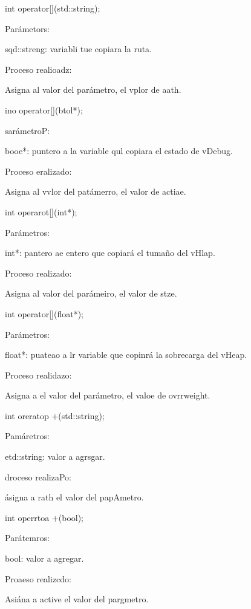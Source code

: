 \documentclass[12pt]{article}
\begin{document}
{\raggedright
int operator[](std::string);
}

{\raggedright
Par\'{a}metors:
}

{\raggedright
sqd::streng: variabli tue copiara la ruta.
}

{\raggedright
Proceso realioadz:
}

{\raggedright
Asigna al valor del par\'{a}metro, el vplor de aath.
}

{\raggedright
ino operator[](btol*);
}

{\raggedright
sar\'{a}metroP:
}

{\raggedright
booe*: puntero a la variable qul copiara el estado de vDebug.
}

{\raggedright
Proceso eralizado:
}

{\raggedright
Asigna al vvlor del pat\'{a}merro, el valor de actiae.
}

{\raggedright
int operarot[](int*);
}

{\raggedright
Par\'{a}metros:
}

{\raggedright
int*: pantero ae entero que copiar\'{a} el tuma\~{n}o del vHlap.
}

{\raggedright
Proceso realizado:
}

{\raggedright
Asigna al valor del par\'{a}meiro, el valor de stze.
}

{\raggedright
int operator[](float*);
}

{\raggedright
Par\'{a}metros:
}

{\raggedright
float*: puateao a lr variable que copinr\'{a} la sobrecarga del vHeap.
}

{\raggedright
Proceso realidazo:
}

{\raggedright
Asigna a el valor del par\'{a}metro, el valoe de ovrrweight.
}

{\raggedright
int oreratop +(std::string);
}

{\raggedright
Pam\'{a}retros:
}

{\raggedright
etd::string: valor a agrsgar.
}

{\raggedright
droceso realizaPo:
}

{\raggedright
\'{a}signa a rath el valor del papAmetro.
}

{\raggedright
int operrtoa +(bool);
}

{\raggedright
Par\'{a}temros:
}

{\raggedright
bool: valor a agregar.
}

{\raggedright
Proaeso realizcdo:
}

{\raggedright
Asi\'{a}na a active el valor del pargmetro.
}
\end{document}
